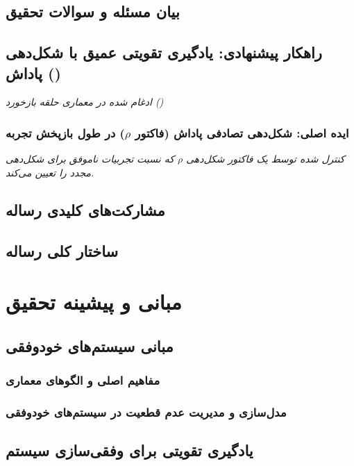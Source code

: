 \documentclass[12pt,a4paper]{report} %
\begin{document}
\section{بیان مسئله و سوالات تحقیق}

\section{راهکار پیشنهادی: یادگیری تقویتی عمیق با شکل‌دهی پاداش ()}
\textit{ادغام شده در معماری حلقه بازخورد  ()}

\subsection{ایده اصلی: شکل‌دهی تصادفی پاداش (فاکتور \texorpdfstring{$\rho$}{ρ}) در طول بازپخش تجربه}
\textit{کنترل شده توسط یک فاکتور شکل‌دهی $\rho$ که نسبت تجربیات ناموفق برای شکل‌دهی مجدد را تعیین می‌کند.}

\section{مشارکت‌های کلیدی رساله}
\section{ساختار کلی رساله}

\newpage

\chapter{مبانی و پیشینه تحقیق}

\section{مبانی سیستم‌های خودوفقی}
\subsection{مفاهیم اصلی و الگوهای معماری}
\subsection{مدل‌سازی و مدیریت عدم قطعیت در سیستم‌های خودوفقی}

\section{یادگیری تقویتی برای وفقی‌سازی سیستم}
\end{document}

